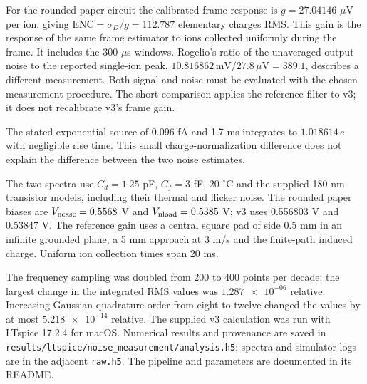 \documentclass[11pt]{article}
\begin{document}
For the rounded paper circuit the calibrated frame response is
$g=27.04146$ $\mu$V per ion, giving $\mathrm{ENC}=\sigma_D/g=112.787$
elementary charges RMS. This gain is the response of the same frame estimator
to ions collected uniformly during the frame. It includes the 300 $\mu$s windows.
Rogelio's ratio of the unaveraged output noise to the reported single-ion
peak, $10.816862\,\mathrm{mV}/27.8\,\mu\mathrm V=389.1$, describes
a different measurement. Both signal and noise must be evaluated with the
chosen measurement procedure. The short comparison applies the reference
filter to v3; it does not recalibrate v3's frame gain.

The stated exponential source of 0.096 fA and 1.7 ms integrates to
$1.018614\,e$ with negligible rise time. This small charge-normalization
difference does not explain the difference between the two noise estimates.

The two spectra use $C_d=1.25$ pF, $C_f=3$ fF, 20 $^\circ$C and the supplied
180 nm transistor models, including their thermal and flicker noise.
The rounded paper biases are $V_{\rm ncasc}=0.5568$ V and
$V_{\rm nload}=0.5385$ V; v3 uses 0.556803 V and 0.53847 V.
The reference gain uses a central square pad of side 0.5 mm in an infinite
grounded plane, a 5 mm approach at 3 m/s and the finite-path induced charge.
Uniform ion collection times span 20 ms.

The frequency sampling was doubled from 200 to 400 points per decade;
the largest change in the integrated RMS values was $\num{1.287e-06}$ relative.
Increasing Gaussian quadrature order from eight to twelve changed the
values by at most $\num{5.218e-14}$ relative. The supplied v3 calculation was run
with LTspice 17.2.4 for macOS. Numerical results and provenance are saved in
\texttt{results/ltspice/noise\_measurement/analysis.h5}; spectra and simulator
logs are in the adjacent \texttt{raw.h5}. The pipeline and parameters are
documented in its README.
\end{document}
